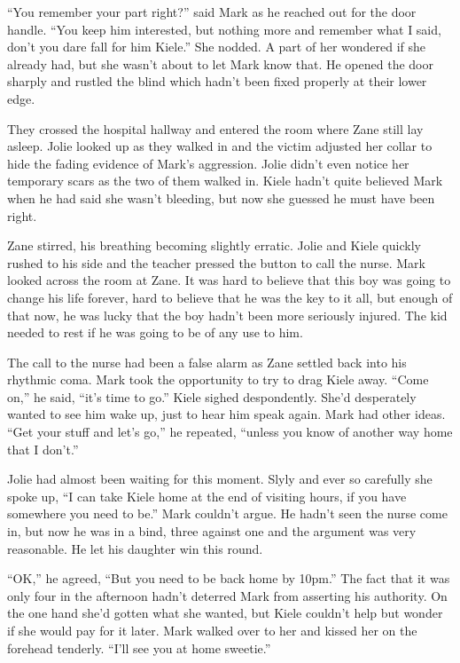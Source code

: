 \thoughtbreak



``You remember your part right?'' said Mark as he reached out for the door handle.  ``You keep him interested, but nothing more and remember what I said, don't you dare fall for him Kiele.''  She nodded.  A part of her wondered if she already had, but she wasn't about to let Mark know that.  He opened the door sharply and rustled the blind which hadn't been fixed properly at their lower edge.

They crossed the hospital hallway and entered the room where Zane still lay asleep.  Jolie looked up as they walked in and the victim adjusted her collar to hide the fading evidence of Mark's aggression.  Jolie didn't even notice her temporary scars as the two of them walked in.  Kiele hadn't quite believed Mark when he had said she wasn't bleeding, but now she guessed he must have been right.

Zane stirred, his breathing becoming slightly erratic.  Jolie and Kiele quickly rushed to his side and the teacher pressed the button to call the nurse.  Mark looked across the room at Zane.  It was hard to believe that this boy was going to change his life forever, hard to believe that he was the key to it all, but enough of that now, he was lucky that the boy hadn't been more seriously injured.  The kid needed to rest if he was going to be of any use to him.  

The call to the nurse had been a false alarm as Zane settled back into his rhythmic coma.  Mark took the opportunity to try to drag Kiele away. ``Come on,'' he said, ``it's time to go.''  Kiele sighed despondently.  She'd desperately wanted to see him wake up, just to hear him speak again.  Mark had other ideas.  ``Get your stuff and let's go,'' he repeated, ``unless you know of another way home that I don't.'' 

Jolie had almost been waiting for this moment.  Slyly and ever so carefully she spoke up, ``I can take Kiele home at the end of visiting hours, if you have somewhere you need to be.''  Mark couldn't argue.  He hadn't seen the nurse come in, but now he was in a bind, three against one and the argument was very reasonable.  He let his daughter win this round.

``OK,'' he agreed, ``But you need to be back home by 10pm.''  The fact that it was only four in the afternoon hadn't deterred Mark from asserting his authority.  On the one hand she'd gotten what she wanted, but Kiele couldn't help but wonder if she would pay for it later.  Mark walked over to her and kissed her on the forehead tenderly.  ``I'll see you at home sweetie.''

